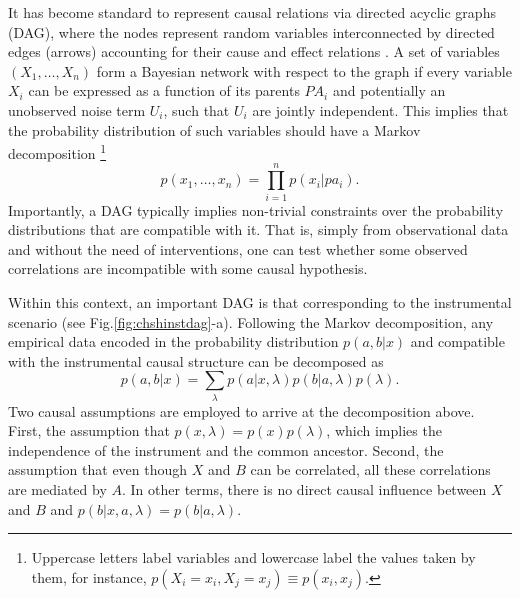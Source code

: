 \documentclass[letterpaper]{article}
\begin{document}
It has become standard to represent causal relations via directed acyclic graphs
(DAG), where the nodes represent random variables interconnected by directed
edges (arrows) accounting for their cause and effect relations \cite{pearlbook}.
A set of variables  $\left( X_1,\dots, X_n \right)$ form a Bayesian network with
respect to the graph if every variable $X_i$ can be expressed as a function of
its parents $PA_i$ and potentially an unobserved noise term $U_i$, such that
$U_i$ are jointly independent. This implies that the probability distribution of
such variables should have a Markov decomposition 
\footnote{Uppercase letters label variables and lowercase label the values taken
by them, for instance, $p(X_i =x_i, X_j = x_j) \equiv p(x_i, x_j)$.}
\begin{equation}
p(x_1,\dots,x_n)= \prod_{i=1}^{n} p(x_i \vert pa_i).    
\end{equation}
Importantly, a DAG typically implies non-trivial constraints over the
probability distributions that are compatible with it. That is, simply from
observational data and without the need of interventions, one can test whether
some observed correlations are incompatible with some causal hypothesis.


Within this context, an important DAG is that corresponding to the instrumental
scenario (see Fig.\ref{fig:chshinstdag}-a). Following the Markov decomposition, any
empirical data encoded in the probability distribution $p(a,b \vert x)$ and
compatible with the instrumental causal structure can be decomposed as
\begin{equation}
p(a,b \vert x) = \sum_{\lambda} p(a\vert x,\lambda) p(b\vert a,\lambda)p(\lambda).
\end{equation}
Two causal assumptions are employed to arrive at the decomposition above. First,
the assumption that $p(x,\lambda)=p(x)p(\lambda)$, which implies the independence of
the instrument and the common ancestor. Second, the assumption that even though
$X$ and $B$ can be correlated, all these correlations are mediated by $A$. In
other terms, there is no direct causal influence between $X$ and $B$ and
$p(b\vert x,a,\lambda)=p(b\vert a,\lambda)$.
\end{document}
